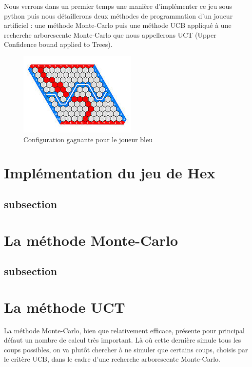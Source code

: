 \documentclass[a4paper]{article}
\theoremstyle{definition}
\begin{document}
Nous verrons dans un premier temps une manière d'implémenter ce jeu sous python puis nous détaillerons deux méthodes de programmation d'un joueur artificiel : une méthode Monte-Carlo puis une méthode UCB appliqué à une recherche arborescente Monte-Carlo que nous appellerons UCT (Upper Confidence bound applied to Trees).

\begin{figure}[h]
\centering
\includegraphics[scale=1]{11x11_gagnant.jpg}
\caption{Configuration gagnante pour le joueur bleu}
\end{figure}




\clearpage

\section{Implémentation du jeu de Hex}

\subsection{subsection}


\clearpage

\section{La méthode Monte-Carlo}

\subsection{subsection}


\clearpage

\section{La méthode UCT}

La méthode Monte-Carlo, bien que relativement efficace, présente pour principal défaut un nombre de calcul très important. Là où cette dernière simule tous les coups possibles, on va plutôt chercher à ne simuler que certains coups, choisis par le critère UCB, dans le cadre d'une recherche arborescente Monte-Carlo.
\end{document}

